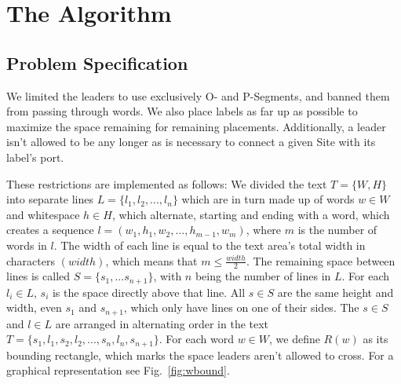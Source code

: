 \documentclass[11pt,a4paper]{vutinfth}
\begin{document}
\chapter{The Algorithm}
\section{Problem Specification}
\label{sec:ProbSpec}
We limited the leaders to use exclusively O- and P-Segments, and banned them from passing through words. We also place labels as far up as possible to maximize the space remaining for  remaining placements. Additionally, a leader isn't allowed to be any longer as is necessary to connect a given Site with its label's port.

These restrictions are implemented as follows: We divided the text $T=\{W,H\}$ into separate lines $L=\{l_1 ,l_2 , ... ,l_n\}$ which are in turn made up of words $w \in W$ and whitespace $h \in H$, which alternate, starting and ending with a word, which creates a sequence $l=(w_1,h_1,w_2, ... , h_{m-1},w_m)$, where $m$ is the number of words in $l$. The width of each line is equal to the text area's total width in characters $(width)$, which means that $m \leq \frac{width}{2}$. The remaining space between lines is called $S=\{s_1, ... s_{n+1}\}$, with $n$ being the number of lines in $L$. For each $l_i \in L$,  $s_i$ is the space directly above that line. All $s \in S$ are the same height and width, even $s_1$ and $s_{n+1}$, which only have lines on one of their sides. The $s \in S$ and $l \in L$ are arranged in alternating order in the text $T=\{s_1, l_1, s_2, l_2, ..., s_n, l_n, s_{n+1}\}$.  For each word $w \in W$, we define $R(w)$  as its bounding rectangle, which marks the space leaders aren't allowed to cross. For a graphical representation see Fig.~\ref*{fig:wbound}.
\end{document}

